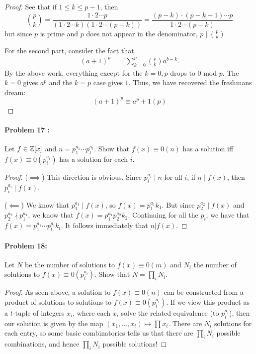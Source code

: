 \begin{proof}
  See that if \(1\leq k\leq p-1\), then
  \[
    \binom{p}{k} = \frac{1 \cdot 2 \cdots p}{(1\cdot 2 \cdots k)(1 \cdot 2 \cdots (p-k))}
    = \frac{(p-k) \cdot  (p-k+1) \cdots p}{1 \cdot 2 \cdots (p-k)}
  \]
  but since \(p\) is prime and \(p\) does not appear in the denominator, \(p\mid \binom{p}{k}\)

  For the second part, consider the fact that
  \begin{align*}
    (a+1)^p &= \sum_{k=0}^p \binom{p}{k} a^{b-k}.
  \end{align*}
  By the above work, everything except for the \(k=0,p\) drops to 0 mod \(p\).
  The \(k=0\) gives \(a^p\) and the \(k=p\) case gives \(1\). Thus, we have
  recovered the freshmans dream:
  \[
    (a+1)^p \equiv a^p+1 (p)
  \]
\end{proof}

\paragraph{Problem 17 :} Let \(f \in\mathbb{Z}[x]\) and
\(n=p_1^{a_1}\cdots p_t^{a_t}\). Show that \(f(x) \equiv 0 (n)\) has a solution
iff \(f(x) \equiv 0 (p_i^{a_i})\) has a solution for each \(i\).

\begin{proof}
  (\(\implies \)) This direction is obvious. Since \(p_i^{a_i}\mid n\) for all
  \(i\), if \(n\mid f(x)\), then \(p_i^{a_i}\mid f(x)\).

  (\(\impliedby \)) We know that \(p_1^{a_1} \mid  f(x)\), so
  \(f(x) = p_1^{a_1}k_1\). But since \(p_2^{a_2} \mid f(x)\) and
  \(p_2^{a_2} \nmid p_1^{a_1}\), we know that \(f(x)=p_1^{a_1}p_2^{a_2}k_2\).
  Continuing for all the \(p_i\), we have that
  \(f(x)=p_1^{a_1}\cdots p_t^{a_t}k_t\). It follows immediately that \(n|f(x)\).
\end{proof}

\paragraph{Problem 18:} Let \(N\) be the number of solutions to
\(f(x) \equiv 0 (m)\) and \(N_i\) the number of solutions to
\(f(x) \equiv 0 (p_i^{a_i})\). Show that \(N = \prod_{i}  N_i\).

\begin{proof}
  As seen above, a solution to \(f(x) \equiv 0 (n)\) can be constructed from a
  product of solutions to solutions to \(f(x) \equiv 0 (p_i^{a_i})\). If we view
  this product as a \(t\)-tuple of integers \(x_i\), where each \(x_i\) solve
  the related equivalence (to \(p_i^{a_i}\)), then our solution is given by the
  map \((x_1, \dots , x_t) \mapsto \prod x_i\). There are \(N_i\) solutions for
  each entry, so some basic combinatorics tells us that there are
  \(\prod_i N_i\) possible combinations, and hence \(\prod_i N_i\) possible solutions!
\end{proof}

